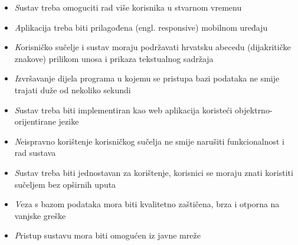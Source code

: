 	\begin{itemize}
		\item 	\textit Sustav treba omoguciti rad više korisnika u stvarnom vremenu
		\item 	\textit Aplikacija treba biti prilagođena (engl. responsive) mobilnom uređaju
		\item 	\textit Korisničko sučelje i sustav moraju podržavati hrvatsku abecedu (dijakritičke znakove) prilikom unosa i prikaza tekstualnog sadržaja
		\item 	\textit Izvršavanje dijela programa u kojemu se pristupa bazi podataka ne smije trajati duže od nekoliko sekundi
		\item 	\textit Sustav treba biti implementiran kao web aplikacija koristeći objektrno-orijentirane jezike
		\item 	\textit Neispravno korištenje korisničkog sučelja ne smije narušiti funkcionalnost i rad sustava
		\item 	\textit Sustav treba biti jednostavan za korištenje, korisnici se moraju znati koristiti sučeljem bez opširnih uputa
		\item 	\textit Veza s bazom podataka mora biti kvalitetno zaštičena, brza i otporna na vanjske greške
		\item 	\textit Pristup sustavu mora biti omogućen iz javne mreže 
	\end{itemize}

